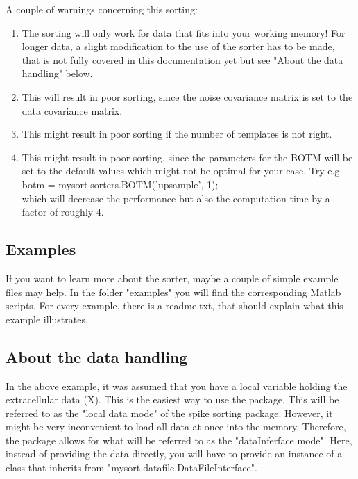 \documentclass[11pt]{article} %
\begin{document}
A couple of warnings concerning this sorting:

\begin{enumerate}
\item The sorting will only work for data that fits into your working memory! For longer data, a slight modification to the use of the sorter has to be made, that is not fully covered in this documentation yet but see "About the data handling" below.

\item This will result in poor sorting, since the noise covariance matrix is set to the data covariance matrix.

\item This might result in poor sorting if the number of templates is not right.

\item This might result in poor sorting, since the parameters for the BOTM will be set to the default values which might not be optimal for your case. Try e.g. \\
botm = mysort.sorters.BOTM('upsample', 1);\\
which will decrease the performance but also the computation time by a factor of roughly 4.
\end{enumerate}

\subsection{Examples}

If you want to learn more about the sorter, maybe a couple of simple example files may help. In the folder "examples" you will find the corresponding Matlab scripts. For every example, there is a readme.txt, that should explain what this example illustrates.

\subsection{About the data handling}

In the above example, it was assumed that you have a local variable holding the extracellular data (X). This is the easiest way to use the package. This will be referred to as the "local data mode" of the spike sorting package. However, it might be very inconvenient to load all data at once into the memory. Therefore, the package allows for what will be referred to as the "dataInferface mode". Here, instead of providing the data directly, you will have to provide an instance of a class that inherits from "mysort.datafile.DataFileInterface".
\end{document}
